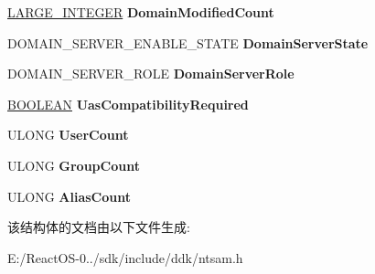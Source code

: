 \begin{DoxyCompactItemize}
\hyperlink{union___l_a_r_g_e___i_n_t_e_g_e_r}{L\+A\+R\+G\+E\+\_\+\+I\+N\+T\+E\+G\+ER} {\bfseries Domain\+Modified\+Count}
\item 
\mbox{\label{struct___d_o_m_a_i_n___g_e_n_e_r_a_l___i_n_f_o_r_m_a_t_i_o_n_a986713259f178d3b5d691298438b112a}} 
D\+O\+M\+A\+I\+N\+\_\+\+S\+E\+R\+V\+E\+R\+\_\+\+E\+N\+A\+B\+L\+E\+\_\+\+S\+T\+A\+TE {\bfseries Domain\+Server\+State}
\item 
\mbox{\label{struct___d_o_m_a_i_n___g_e_n_e_r_a_l___i_n_f_o_r_m_a_t_i_o_n_a1df1b65e47bf32b61b16437854dbb5a8}} 
D\+O\+M\+A\+I\+N\+\_\+\+S\+E\+R\+V\+E\+R\+\_\+\+R\+O\+LE {\bfseries Domain\+Server\+Role}
\item 
\mbox{\label{struct___d_o_m_a_i_n___g_e_n_e_r_a_l___i_n_f_o_r_m_a_t_i_o_n_a9beaa279ba317a9d05cbaac5faa39284}} 
\hyperlink{_processor_bind_8h_a112e3146cb38b6ee95e64d85842e380a}{B\+O\+O\+L\+E\+AN} {\bfseries Uas\+Compatibility\+Required}
\item 
\mbox{\label{struct___d_o_m_a_i_n___g_e_n_e_r_a_l___i_n_f_o_r_m_a_t_i_o_n_a0b94ee76ec857686c7f35065acea9c5e}} 
U\+L\+O\+NG {\bfseries User\+Count}
\item 
\mbox{\label{struct___d_o_m_a_i_n___g_e_n_e_r_a_l___i_n_f_o_r_m_a_t_i_o_n_adf7bf6c3382570cfed7c42bd3a5cc6fc}} 
U\+L\+O\+NG {\bfseries Group\+Count}
\item 
\mbox{\label{struct___d_o_m_a_i_n___g_e_n_e_r_a_l___i_n_f_o_r_m_a_t_i_o_n_a694fea53f4c529202d7b3e05c8af60eb}} 
U\+L\+O\+NG {\bfseries Alias\+Count}
\end{DoxyCompactItemize}


该结构体的文档由以下文件生成\+:\begin{DoxyCompactItemize}
\item 
E\+:/\+React\+O\+S-\/0../sdk/include/ddk/ntsam.\+h\end{DoxyCompactItemize}
